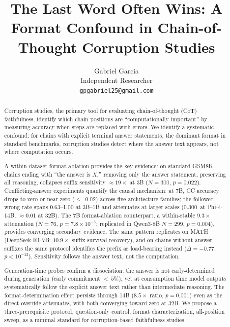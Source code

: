 \documentclass{article}
\title{The Last Word Often Wins: A Format Confound in Chain-of-Thought Corruption Studies}
\author{
  Gabriel Garcia \\
  Independent Researcher \\
  \texttt{gpgabriel25@gmail.com}
}
\theoremstyle{definition}
\theoremstyle{definition}
\newcommand{\CCFW}{0.63}
\newcommand{\SBCCFW}{1.00}
\newcommand{\PHIFOURCCFW}{0.300}
\begin{document}
\maketitle

\begin{abstract}
Corruption studies, the primary tool for evaluating chain-of-thought
(CoT) faithfulness, identify which chain positions are ``computationally
important'' by measuring accuracy when steps are replaced with errors.
We identify a systematic confound: for chains with explicit terminal answer
statements, the dominant format in standard benchmarks, corruption studies
detect where the answer text appears, not where computation occurs.

A within-dataset format ablation provides the key evidence: on standard
GSM8K chains ending with ``the answer is $X$,'' removing only the answer
statement, preserving all reasoning, collapses suffix sensitivity
${\approx}19\times$ at 3B ($N{=}300$, $p{=}0.022$).
Conflicting-answer experiments quantify the causal mechanism:
at 7B, CC accuracy drops to zero or near-zero ($\leq$~0.02) across five
architecture families; the followed-wrong rate
spans \CCFW--\SBCCFW{} at 3B--7B and attenuates at larger scales
(\PHIFOURCCFW\ at Phi-4-14B, $\approx$0.01 at 32B).
The 7B format-ablation counterpart, a within-stable $9.3\times$
attenuation ($N{=}76$, $p{=}7.8{\times}10^{-3}$; replicated in Qwen3-8B
$N{=}299$, $p{=}0.004$), provides converging secondary evidence.
The same pattern replicates on MATH (DeepSeek-R1-7B:
$10.9\times$ suffix-survival recovery), and on chains without answer
suffixes the same protocol identifies the prefix as load-bearing instead
($\Delta{=}{-}0.77$, $p{<}10^{-12}$). Sensitivity follows the answer text,
not the computation.

Generation-time probes confirm a dissociation: the answer is not
early-determined during generation (early commitment ${<}\,5\%$), yet at
consumption time model outputs systematically follow the explicit answer
text rather than intermediate reasoning. The format-determination
effect persists through 14B ($8.5\times$ ratio, $p{=}0.001$) even as
the direct override attenuates, with both converging toward zero at 32B.
We propose a three-prerequisite protocol, question-only control, format
characterization, all-position sweep, as a minimal standard for
corruption-based faithfulness studies.
\end{abstract}

\end{document}
